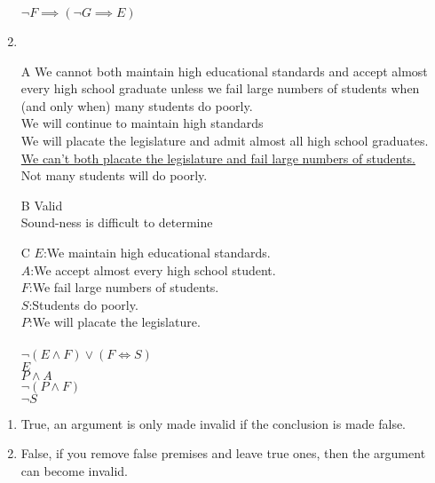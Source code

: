 \documentclass{article}
\begin{document}
\begin{enumerate}
$\lnot F \implies (\lnot G \implies E)$
\item
\item[A]
We cannot both maintain high educational standards and accept almost every high school graduate unless we fail large numbers of students when (and only when) many students do poorly.
\\We will continue to maintain high standards
\\We will placate the legislature and admit almost all high school graduates.
\\\underline{We can't both placate the legislature and fail large numbers of students.}
\\Not many students will do poorly.
\item[B]
Valid
\\Sound-ness is difficult to determine
\item[C]
$E$:We maintain high educational standards.\\
$A$:We accept almost every high school student.\\
$F$:We fail large numbers of students.\\
$S$:Students do poorly.\\
$P$:We will placate the legislature.\\
\\
$\lnot(E \land F)\lor(F \iff S)$\\
$E$\\
$P \land A$\\
\underline{$\lnot (P \land F)$}\\
$\lnot S$
\end{enumerate}
\begin{enumerate}
\item
True, an argument is only made invalid if the conclusion is made false.
\item
False, if you remove false premises and leave true ones, then the argument can become invalid.
\end{enumerate}
\end{document}
